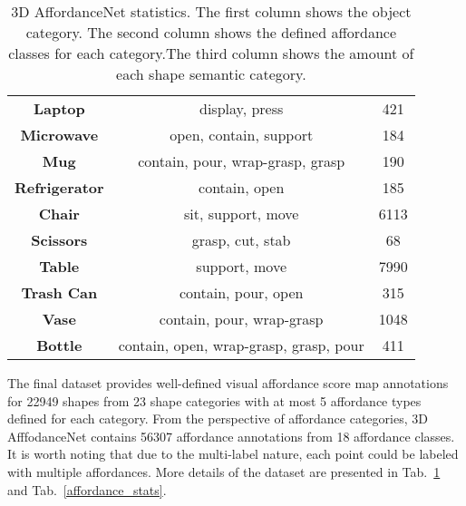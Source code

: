 \documentclass[final]{cvpr}
\begin{document}
\begin{table}[t]
\begin{center}
{\begin{tabular}{c|c|c}
            \textbf{Laptop}            & display, press                                             & 421                            \\
            \textbf{Microwave}         & open, contain, support                                     & 184                             \\
            \textbf{Mug}               & contain, pour, wrap-grasp, grasp                           & 190                            \\
            \textbf{Refrigerator}      & contain, open                                              & 185                             \\
            \textbf{Chair}             & sit, support, move                                         & 6113                          \\
            \textbf{Scissors}          & grasp, cut, stab                                           & 68                              \\
            \textbf{Table}             & support, move                                              & 7990                            \\
            \textbf{Trash Can}         & contain, pour, open                                        & 315                            \\
            \textbf{Vase}              & contain, pour, wrap-grasp                                  & 1048                           \\
            \textbf{Bottle}            & contain, open, wrap-grasp, grasp, pour                     & 411                \\ \hline
         \end{tabular}}
   \end{center}
   \vspace{-0.2cm}
   \caption{3D AffordanceNet statistics. The first column shows the object category. The second column shows the defined affordance classes for each category.The third column shows the amount of each shape semantic category. }
   \label{dataset_stats}
   \vspace{-0.2cm}
\end{table}





The final dataset provides well-defined visual affordance score map annotations for 22949 shapes from 23 shape categories with at most 5 affordance types defined for each category. From the perspective of affordance categories, 3D AfffodanceNet contains 56307 affordance annotations from 18 affordance classes. It is worth noting that due to the multi-label nature, each point could be labeled with multiple affordances. More details of the dataset are presented in Tab.~\ref{dataset_stats} and Tab.~\ref{affordance_stats}. 
\end{document}
